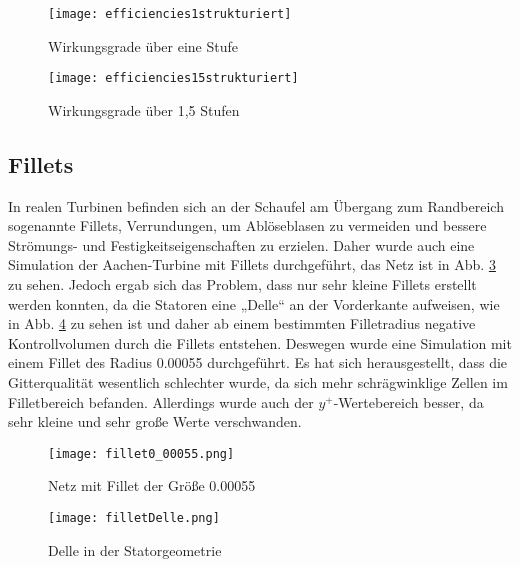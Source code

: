 \begin{figure}[H]
	\centering
	\texttt{[image: efficiencies1strukturiert]}
	\caption{Wirkungsgrade über eine Stufe} \label{fig:efficiencies1strukturiert}
\end{figure}

\begin{figure}[H]
	\centering
	\texttt{[image: efficiencies15strukturiert]}
	\caption{Wirkungsgrade über 1,5 Stufen} \label{fig:efficiencies15strukturiert}
\end{figure}


\subsection{Fillets}

In realen Turbinen befinden sich an der Schaufel am Übergang zum Randbereich sogenannte Fillets, Verrundungen, um Ablöseblasen zu vermeiden und bessere Strömungs- und Festigkeitseigenschaften zu erzielen. Daher wurde auch eine Simulation der Aachen-Turbine mit Fillets durchgeführt, das Netz ist in Abb. \ref{imgFillet1} zu sehen. Jedoch ergab sich das Problem, dass nur sehr kleine Fillets erstellt werden konnten, da die Statoren eine „Delle“ an der Vorderkante aufweisen, wie in Abb. \ref{imgFilletDelle} zu sehen ist und daher ab einem bestimmten Filletradius negative Kontrollvolumen durch die Fillets entstehen. Deswegen wurde eine Simulation mit einem Fillet des Radius 0.00055 durchgeführt. Es hat sich herausgestellt, dass die Gitterqualität wesentlich schlechter wurde, da sich mehr schrägwinklige Zellen im Filletbereich befanden. Allerdings wurde auch der $y^+$-Wertebereich  besser, da sehr kleine und sehr große Werte verschwanden.     

  \begin{figure}[H]
	\centering
	\texttt{[image: fillet0\_00055.png]}
	\caption{Netz mit Fillet der Größe 0.00055} \label{imgFillet1}
\end{figure} 

  \begin{figure}[H]
	\centering
	\texttt{[image: filletDelle.png]}
	\caption{Delle in der Statorgeometrie} \label{imgFilletDelle}
\end{figure} 